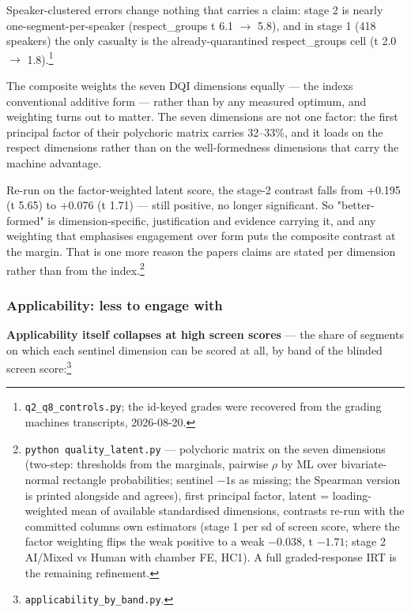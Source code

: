 Speaker-clustered errors change nothing that carries a claim: stage 2 is
nearly one-segment-per-speaker (respect\_groups t 6.1 \(\rightarrow\) 5.8), and in stage 1
(418 speakers) the only casualty is the already-quarantined respect\_groups
cell (t 2.0 \(\rightarrow\) 1.8).\footnote{\texttt{q2\_q8\_controls.py}; the id-keyed grades were recovered from the
  grading machine\textquotesingle s transcripts, 2026-08-20.}

The composite weights the seven DQI dimensions equally --- the index\textquotesingle s conventional additive form --- rather than by any measured optimum, and weighting turns out to matter. The seven dimensions are not one factor: the first principal factor of their polychoric matrix carries 32--33\%, and it loads on the respect dimensions rather than on the well-formedness dimensions that carry the machine advantage.

Re-run on the factor-weighted latent score, the stage-2 contrast falls from +0.195 (t 5.65) to +0.076 (t 1.71) --- still positive, no longer significant. So "better-formed" is dimension-specific, justification and evidence carrying it, and any weighting that emphasises engagement over form puts the composite contrast at the margin. That is one more reason the paper\textquotesingle s claims are stated per dimension rather than from the index.\footnote{\texttt{python\ quality\_\allowbreak{}latent.\allowbreak{}py} --- polychoric matrix on the seven
  dimensions (two-step: thresholds from the marginals, pairwise \(\rho\) by ML
  over bivariate-normal rectangle probabilities; sentinel \(-1\)s as
  missing; the Spearman version is printed alongside and agrees), first
  principal factor, latent = loading-weighted mean of available
  standardised dimensions, contrasts re-run with the committed columns\textquotesingle{}
  own estimators (stage 1 per sd of screen score, where the factor
  weighting flips the weak positive to a weak \(-0.038\), t \(-1.71\); stage 2
  AI/Mixed vs Human with chamber FE, HC1). A full graded-response IRT
  is the remaining refinement.}

\subsubsection{Applicability: less to engage with}\label{sec:applicability}

\textbf{Applicability itself collapses at high screen
scores} --- the share of segments on which each sentinel dimension can be
scored at all, by band of the blinded screen score:\footnote{\texttt{applicability\_\allowbreak{}by\_\allowbreak{}band.\allowbreak{}py}.}

